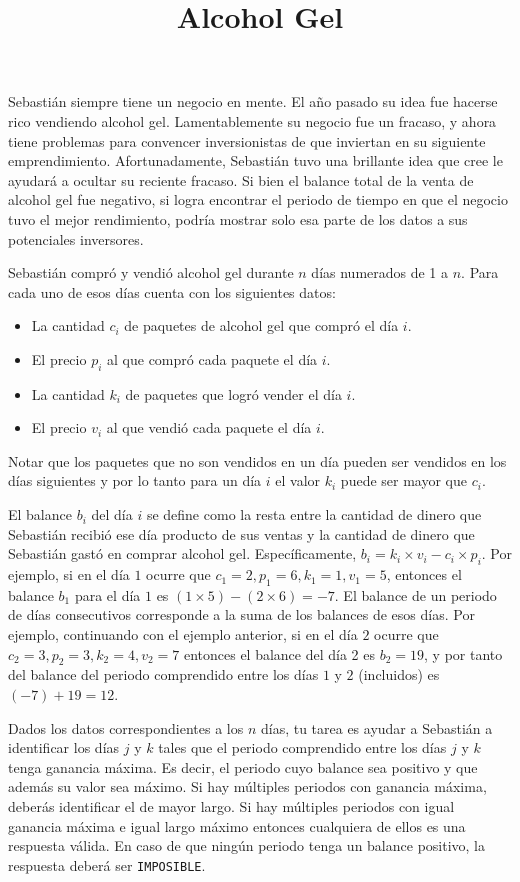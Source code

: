 \documentclass{oci}
\title{Alcohol Gel}
\begin{document}
\begin{problemDescription}
Sebastián siempre tiene un negocio en mente.
El año pasado su idea fue hacerse rico vendiendo alcohol gel.
Lamentablemente su negocio fue un fracaso, y ahora tiene problemas para convencer inversionistas de que
inviertan en su siguiente emprendimiento.
Afortunadamente, Sebastián tuvo una brillante idea que cree le ayudará a ocultar su reciente fracaso.
Si bien el balance total de la venta de alcohol gel fue negativo, si logra encontrar el
periodo de tiempo en que el negocio tuvo el mejor rendimiento, podría mostrar solo esa parte de los
datos a sus potenciales inversores.

Sebastián compró y vendió alcohol gel durante $n$ días numerados de 1 a $n$.
Para cada uno de esos días cuenta con los siguientes datos:
\begin{itemize}
	\item La cantidad $c_i$ de paquetes de alcohol gel que compró el día $i$.
	\item El precio $p_i$ al que compró cada paquete el día $i$.
	\item La cantidad $k_i$ de paquetes que logró vender el día $i$.
	\item El precio $v_i$ al que vendió cada paquete el día $i$.
\end{itemize}
Notar que los paquetes que no son vendidos en un día pueden ser vendidos en los días siguientes y por
lo tanto para un día $i$ el valor $k_i$ puede ser mayor que $c_i$.

El balance $b_i$ del día $i$ se define como la resta entre la cantidad de dinero que Sebastián
recibió ese día producto de sus ventas y la cantidad de dinero que Sebastián gastó en comprar alcohol gel.
Específicamente, $b_i = k_i\times v_i - c_i\times p_i$.
Por ejemplo, si en el día $1$ ocurre que $c_1 = 2, p_1 = 6, k_1=1, v_1=5$, entonces el balance $b_1$
para el día $1$ es $(1 \times 5) - (2 \times 6) = -7$.
El balance de un periodo de días consecutivos corresponde a la suma de los balances de esos días.
Por ejemplo, continuando con el ejemplo anterior, si en el día $2$ ocurre que
$c_2 = 3, p_2 = 3, k_2=4, v_2=7$ entonces el balance del día 2 es $b_2=19$, y por tanto del balance
del periodo comprendido entre los días $1$ y $2$ (incluidos) es $(-7) + 19 = 12$.

Dados los datos correspondientes a los $n$ días, tu tarea es ayudar a Sebastián a identificar los días
$j$ y $k$ tales que el periodo comprendido entre los días $j$ y $k$ tenga ganancia máxima.
Es decir, el periodo cuyo balance sea positivo y que además su valor sea máximo.
Si hay múltiples periodos con ganancia máxima, deberás identificar el de mayor largo.
Si hay múltiples periodos con igual ganancia máxima e igual largo máximo entonces cualquiera de ellos
es una respuesta válida.
En caso de que ningún periodo tenga un balance positivo, la respuesta deberá ser \verb|IMPOSIBLE|.

\end{problemDescription}
\end{document}
